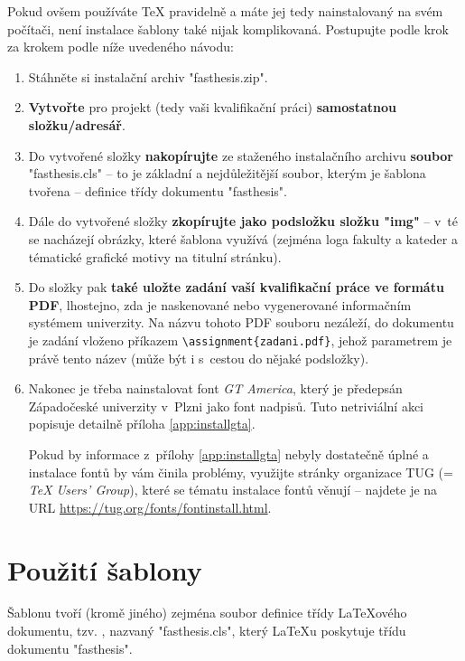 \documentclass[czech, ma, kiv, he, iso690alph, pdf, viewonly]{fasthesis}
\begin{document}
Pokud ovšem používáte \TeX{} pravidelně a máte jej tedy nainstalovaný na svém počítači, není instalace šablony také nijak komplikovaná. Postupujte podle krok za krokem podle níže uvedeného návodu:
\begin{enumerate}
\item Stáhněte si instalační archiv \filename"fasthesis.zip".
\item \textbf{Vytvořte} pro projekt (tedy vaši kvalifikační práci) \textbf{samostatnou složku/adresář}.
\item Do vytvořené složky \textbf{nakopírujte} ze staženého instalačního archivu \textbf{soubor} \filename"fasthesis.cls" -- to je základní a nejdůležitější soubor, kterým je šablona tvořena -- definice třídy dokumentu \filename"fasthesis".
\item Dále do vytvořené složky \textbf{zkopírujte jako podsložku složku \filename"img"} -- v~té se nacházejí obrázky, které šablona využívá (zejména loga fakulty a kateder a tématické grafické motivy na titulní stránku).
\item Do složky pak \textbf{také uložte zadání vaší kvalifikační práce ve formátu PDF}, lhostejno, zda je naskenované nebo vygenerované informačním systémem univerzity. Na názvu tohoto PDF souboru nezáleží, do dokumentu je zadání vloženo příkazem \verb"\assignment{zadani.pdf}", jehož parametrem je právě tento název (může být i s~cestou do nějaké podsložky).
\item Nakonec je třeba nainstalovat font \emph{GT America}, který je předepsán  Západočeské univerzity v~Plzni jako font nadpisů. Tuto netriviální akci popisuje detailně příloha \ref{app:installgta}.

Pokud by informace z~přílohy \ref{app:installgta} nebyly dostatečně úplné a instalace fontů by vám činila problémy, využijte stránky organizace TUG (= \textit{\TeX{} Users' Group}), které se tématu instalace fontů věnují -- najdete je na URL \url{https://tug.org/fonts/fontinstall.html}.
\end{enumerate}
%
%
%
%
\chapter{Použití šablony}
Šablonu tvoří (kromě jiného) zejména soubor definice třídy \LaTeX{}ového dokumentu, tzv. , nazvaný \filename"fasthesis.cls", který \LaTeX{}u poskytuje třídu dokumentu \filename"fasthesis".
\end{document}
